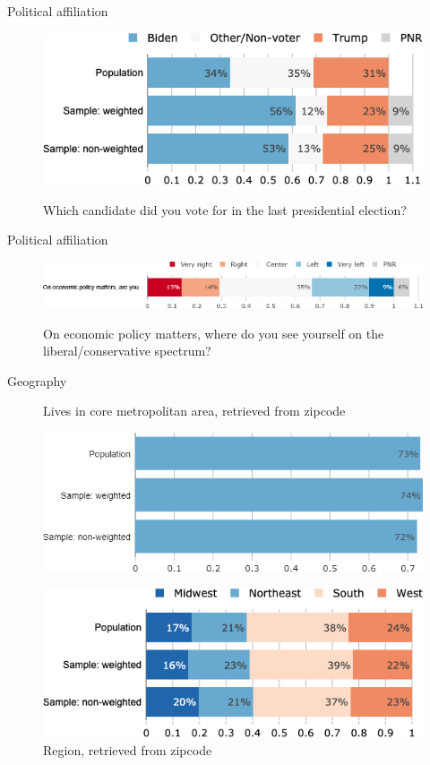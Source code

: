 \documentclass[aspectratio=169,9pt,dvipsnames]{beamer}
\begin{document}
\begin{frame}{Political affiliation}%
\begin{figure}[h!]
\centering
\caption{Which candidate did you vote for in the last presidential election?}
\includegraphics[width=.7\textwidth]{../figures/US/vote_US_comp.png} \\
\end{figure}
\end{frame}

\begin{frame}{Political affiliation}%
\begin{figure}[h!]
\centering
\caption{On economic policy matters, where do you see yourself on the liberal/conservative spectrum?}
\includegraphics[width=\textwidth]{../figures/US/left_right_US.png} \\
\end{figure}
\end{frame}

\begin{frame}{Geography}%
\begin{figure}[h!]
\centering
\caption{Lives in core metropolitan area, retrieved from zipcode}
\includegraphics[width=.5\textwidth]{../figures/US/urban_US_comp.png} \\
\vspace{.2cm}
\caption{Region, retrieved from zipcode}
\includegraphics[width=.5\textwidth]{../figures/US/region_US_comp.png}
\end{figure}
\end{frame}
\end{document}
